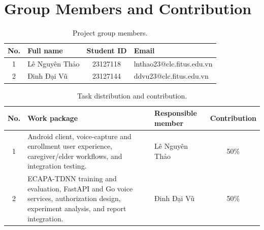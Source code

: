 \section*{Group Members and Contribution}

\begin{table}[H]
\centering
\begin{tabularx}{\textwidth}{cXcX}
\toprule
\textbf{No.} & \textbf{Full name} & \textbf{Student ID} & \textbf{Email} \\
\midrule
1 & Lê Nguyên Thảo & 23127118 & lnthao23@clc.fitus.edu.vn \\
2 & Đinh Đại Vũ & 23127144 & ddvu23@clc.fitus.edu.vn \\
\bottomrule
\end{tabularx}
\caption{Project group members.}
\label{tab:members}
\end{table}

\begin{table}[H]
\centering
\begin{tabularx}{\textwidth}{cX X c}
\toprule
\textbf{No.} & \textbf{Work package} & \textbf{Responsible member} & \textbf{Contribution} \\
\midrule
1 & Android client, voice-capture and enrollment user experience, caregiver/elder workflows, and integration testing. & Lê Nguyên Thảo & 50\% \\
2 & ECAPA-TDNN training and evaluation, FastAPI and Go voice services, authorization design, experiment analysis, and report integration. & Đinh Đại Vũ & 50\% \\
\bottomrule
\end{tabularx}
\caption{Task distribution and contribution.}
\label{tab:contribution}
\end{table}
